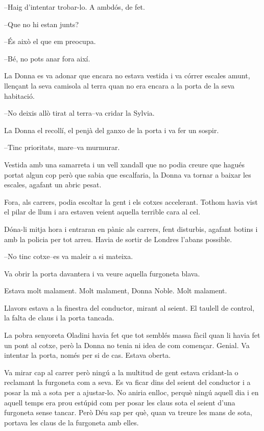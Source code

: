 --Haig d'intentar trobar-lo. A ambdós, de fet.

--Que no hi estan junts?

--És això el que em preocupa.

--Bé, no pots anar fora així.

La Donna es va adonar que encara no estava vestida i va córrer escales
amunt, llençant la seva camisola al terra quan no era encara a la porta
de la seva habitació.

--No deixis allò tirat al terra--va cridar la Sylvia.

La Donna el recollí, el penjà del ganxo de la porta i va fer un sospir.

--Tinc prioritats, mare--va murmurar.

Vestida amb una samarreta i un vell xandall que no podia creure que
hagués portat algun cop però que sabia que escalfaria, la Donna va
tornar a baixar les escales, agafant un abric pesat.

Fora, als carrers, podia escoltar la gent i els cotxes accelerant.
Tothom havia vist el pilar de llum i ara estaven veient aquella terrible
cara al cel.

Dóna-li mitja hora i entraran en pànic als carrers, fent disturbis,
agafant botins i amb la policia per tot arreu. Havia de sortir de
Londres l'abans possible.

--No tinc cotxe--es va maleir a si mateixa.

Va obrir la porta davantera i va veure aquella furgoneta blava.

Estava molt malament. Molt malament, Donna Noble. Molt malament.

Llavors estava a la finestra del conductor, mirant al seient. El taulell
de control, la falta de claus i la porta tancada.

La pobra senyoreta Oladini havia fet que tot semblés massa fàcil quan li
havia fet un pont al cotxe, però la Donna no tenia ni idea de com
començar. Genial. Va intentar la porta, només per si de cas. Estava
oberta.

Va mirar cap al carrer però ningú a la multitud de gent estava
cridant-la o reclamant la furgoneta com a seva. Es va ficar dins del
seient del conductor i a posar la mà a sota per a ajustar-lo. No aniria
enlloc, perquè ningú aquell dia i en aquell temps era prou estúpid com
per posar les claus sota el seient d'una furgoneta sense tancar. Però
Déu sap per què, quan va treure les mans de sota, portava les claus de
la furgoneta amb elles.

